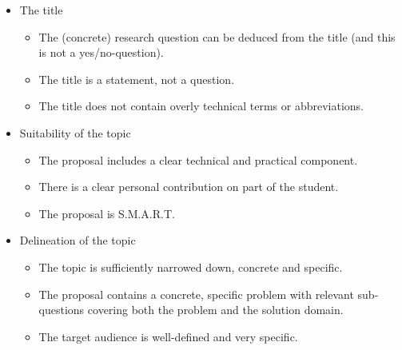 \begin{itemize}
	\item The title
	\begin{itemize}
		\item The (concrete) research question can be deduced from the title (and this is not a yes/no-question).
		\item The title is a statement, not a question.
		\item The title does not contain overly technical terms or abbreviations.
	\end{itemize}
	\item Suitability of the topic
	\begin{itemize}
		\item The proposal includes a clear technical and practical component.
		\item There is a clear personal contribution on part of the student.
		\item The proposal is S.M.A.R.T.
	\end{itemize}
	\item Delineation of the topic
	\begin{itemize}
		\item The topic is sufficiently narrowed down, concrete and specific.
		\item The proposal contains a concrete, specific problem with relevant sub-questions covering both the problem and the solution domain.
		\item The target audience is well-defined and very specific.
	\end{itemize}
	
\end{itemize}
